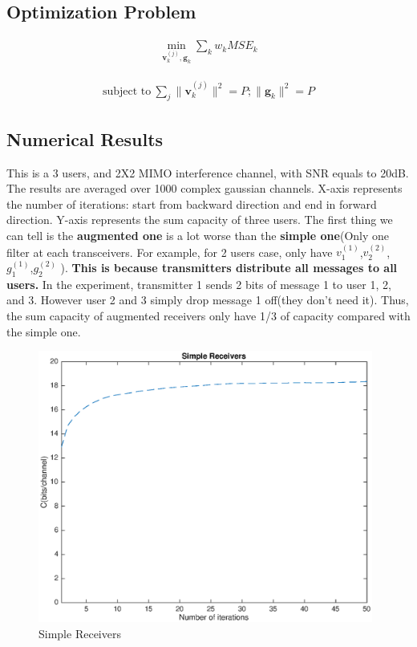 \documentclass[11pt, oneside]{article}   	%
\begin{document}
\subsection{Optimization Problem}
\begin{align*}
\min_{\textbf{v}_{k}^{(j)} ,\textbf{g}_{k}} \displaystyle\sum_{k} 	w_k	MSE_{k}	
\end{align*}

\begin{align*}
\text{subject to}  \ \displaystyle\sum_{j}	\|	\textbf{v}^{(j)}_{k}	\|^{2} = P; \| \textbf{g}_{k}	\|^{2} = P
\end{align*}

\subsection{Numerical Results}
This is a 3 users, and 2X2 MIMO interference channel, with SNR equals to 20dB. The results are averaged over 1000 complex gaussian channels. X-axis represents the number of iterations: start from backward direction and end in forward direction. Y-axis represents the sum capacity of three users. The first thing we can tell is the \textbf{augmented one} is a lot worse than the \textbf{simple one}(Only one filter at each transceivers. For example, for 2 users case, only have $v^{(1)}_1$,$v^{(2)}_2$,$g^{(1)}_1$,$g^{(2)}_2$ ). \textbf{This is because transmitters distribute all messages to all users.} In the experiment, transmitter 1 sends 2 bits of message 1 to user 1, 2, and 3. However user 2 and 3 simply drop message 1 off(they don't need it). Thus, the sum capacity of augmented receivers only have 1/3 of capacity compared with the simple one.

 \begin{figure}[h]
    \centering
    \centerline{\includegraphics[width=110mm]{Simple_Receivers}}
    \caption{Simple Receivers}
\end{figure} 
\end{document}
